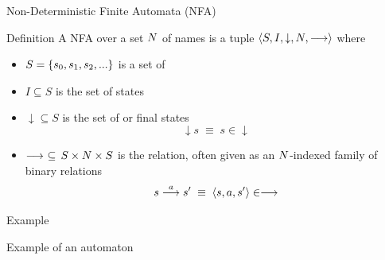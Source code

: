 \documentclass[aspectratio=169]{beamer}
\begin{document}
\begin{slide}{Non-Deterministic Finite Automata (NFA)}
\small
\begin{block}{Definition}
A NFA over a set $N$ of names is a tuple
$\mathopen{\langle}S, I, \downarrow, N,  \longrightarrow\mathclose{\rangle}$ where
\begin{itemize}
\item $S = \mathopen{ \{ }s_0, s_1, s_2, ...\mathclose{ \} }$ is a set of 
\item $I \subseteq S$ is the set of  states
\item  $\downarrow \subseteq S$ is the set of  or final states
\begin{equation*}
\downarrow s \; \equiv\; s \in \downarrow
\end{equation*}
\item  $\longrightarrow \,\,\subseteq\, S \times N \times S$ is the  relation, often given as an $N$-indexed family of binary relations 
\begin{equation*}
s \stackrel{a}{\longrightarrow} s'\; \equiv\; \mathopen{\langle}s,a,s'\mathclose{\rangle} \in \longrightarrow
\end{equation*}
\end{itemize}
\end{block}
\end{slide}


\begin{slide}{Example}
  \begin{block}{Example of an automaton}
  \centering
  ~~~~
  \end{block}
  ~\\[-3mm]
  \begin{block}{}
      \\[0.30\textheight]
  \end{block}

\end{slide}
\end{document}
